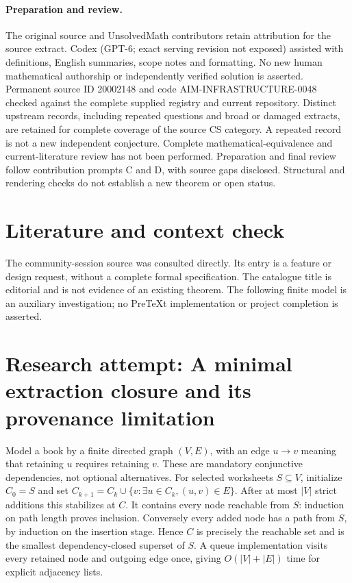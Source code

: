 \documentclass[11pt]{article}
\begin{document}
\paragraph{Preparation and review.}
The original source and UnsolvedMath contributors retain attribution for the source extract. Codex (GPT-6; exact serving revision not exposed) assisted with definitions, English summaries, scope notes and formatting. No new human mathematical authorship or independently verified solution is asserted. Permanent source ID 20002148 and code AIM-INFRASTRUCTURE-0048 checked against the complete supplied registry and current repository. Distinct upstream records, including repeated questions and broad or damaged extracts, are retained for complete coverage of the source CS category. A repeated record is not a new independent conjecture. Complete mathematical-equivalence and current-literature review has not been performed. Preparation and final review follow contribution prompts C and D, with source gaps disclosed. Structural and rendering checks do not establish a new theorem or open status.
\label{end:20002148}

\section{Literature and context check}
The community-session source was consulted directly. Its entry is a feature or design request, without a complete formal specification. The catalogue title is editorial and is not evidence of an existing theorem. The following finite model is an auxiliary investigation; no PreTeXt implementation or project completion is asserted.
\section{Research attempt: A minimal extraction closure and its provenance limitation}
Model a book by a finite directed graph $(V,E)$, with an edge $u\to v$ meaning that retaining $u$ requires retaining $v$. These are mandatory conjunctive dependencies, not optional alternatives. For selected worksheets $S\subseteq V$, initialize $C_0=S$ and set $C_{k+1}=C_k\cup\{v:\exists u\in C_k,(u,v)\in E\}$. After at most $|V|$ strict additions this stabilizes at $C$. It contains every node reachable from $S$: induction on path length proves inclusion. Conversely every added node has a path from $S$, by induction on the insertion stage. Hence $C$ is precisely the reachable set and is the smallest dependency-closed superset of $S$. A queue implementation visits every retained node and outgoing edge once, giving $O(|V|+|E|)$ time for explicit adjacency lists.
\end{document}
